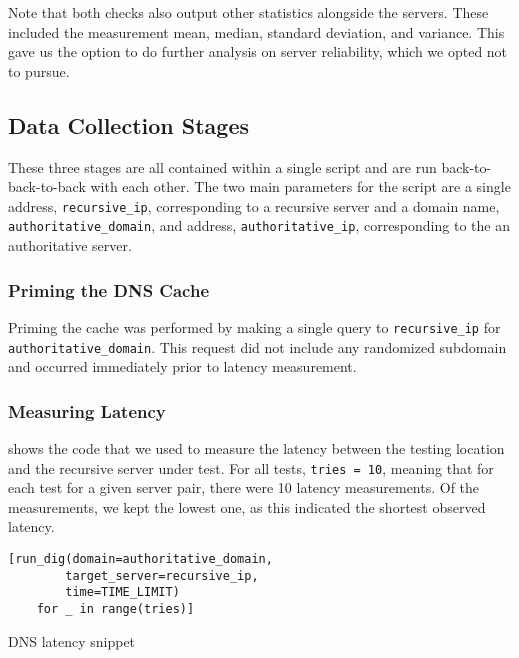 Note that both checks also output other statistics alongside the servers. These included the measurement mean, median, standard deviation, and variance. This gave us the option to do further analysis on server reliability, which we opted not to pursue.

\subsection{Data Collection Stages}

These three stages are all contained within a single script and are run back-to-back-to-back with each other. The two main parameters for the script are a single \ip address, \texttt{recursive\_ip}, corresponding to a recursive server and a domain name, \texttt{authoritative\_domain}, and \ip address, \texttt{authoritative\_ip}, corresponding to the an authoritative server.

\subsubsection{Priming the DNS Cache}

Priming the \dns cache was performed by making a single \dns query to \texttt{recursive\_ip} for \texttt{authoritative\_domain}. This request did not include any randomized subdomain and occurred immediately prior to latency measurement.

\subsubsection{Measuring Latency}

 shows the code that we used to measure the latency between the testing location and the recursive \dns server under test. For all tests, \texttt{tries = 10}, meaning that for each test for a given server pair, there were 10 latency measurements. Of the measurements, we kept the lowest one, as this indicated the shortest observed latency.

\begin{code}[h]
\centering
\begin{minipage}{0.60\textwidth}
    \begin{verbatim}
[run_dig(domain=authoritative_domain, 
        target_server=recursive_ip, 
        time=TIME_LIMIT) 
    for _ in range(tries)]
    \end{verbatim}
\end{minipage}
    \caption{DNS latency snippet}
    \label{fig:dns_latency_snippet}
\end{code}


